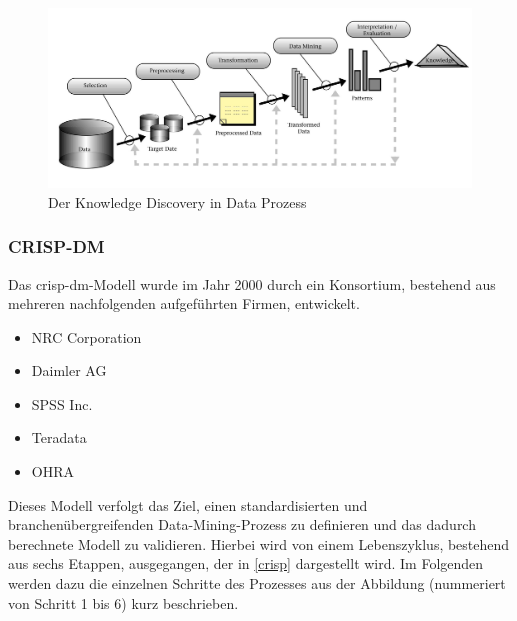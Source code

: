 \begin{figure}[H]
\centering
\includegraphics[scale=0.85]{se-wa-jpg/kdd}
\caption[Der Knowledge Discovery in Data Prozess]{Der Knowledge Discovery in Data Prozess\protect\footnotemark}
\label{kddpic}
\end{figure}


\subsubsection{CRISP-DM}
Das \gls{crisp-dm}-Modell wurde im Jahr 2000 durch ein Konsortium, bestehend aus mehreren nachfolgenden aufgeführten Firmen, entwickelt.

\begin{itemize}
\item NRC Corporation
\item Daimler AG
\item SPSS Inc.
\item Teradata 
\item OHRA
\end{itemize}

Dieses Modell verfolgt das Ziel, einen standardisierten und branchenübergreifenden Data-Mining-Prozess zu definieren und das dadurch berechnete Modell zu validieren. Hierbei wird von einem Lebenszyklus, bestehend aus sechs Etappen, ausgegangen, der in \vref{crisp} dargestellt wird. Im Folgenden werden dazu die einzelnen Schritte des Prozesses aus der Abbildung (nummeriert von Schritt 1 bis 6) kurz beschrieben.


